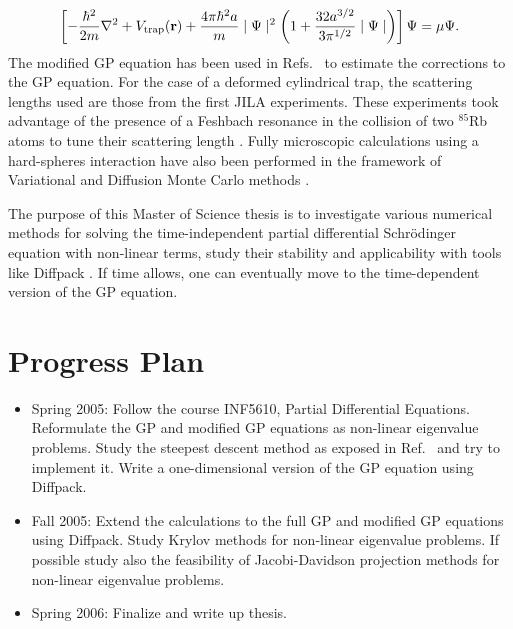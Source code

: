 \begin{equation}
  \left [ - \frac {\hbar^2}{2m} \nabla^2 + V_{\mathrm{trap}}({\bf r})+\frac {4 \pi \hbar^2 a}{m} \mid \Psi \mid^2 
    \left (1 + \frac {32 a^{3/2}}{3 \pi^{1/2}} \mid \Psi\mid \right)
    \right ] \Psi =  \mu \Psi .
\label{gp2}
\end{equation}
The modified GP equation has been used in Refs.~\cite{jon2005,fabro99} to estimate the 
corrections to the GP equation. For the case of a
deformed cylindrical trap, the  scattering lengths used 
are those from the first JILA experiments. These experiments took 
advantage of the  presence of a Feshbach resonance in the collision of two
$^{85}$Rb atoms to tune their scattering length \cite{dalfovo99}.
Fully microscopic calculations using  a hard-spheres interaction have
also been performed in the framework of Variational and Diffusion Monte
Carlo methods \cite{jon2005,glyde1,glyde2,glyde3,blume1}. 

The purpose of this Master of Science thesis
is to investigate various numerical methods for solving
the time-independent partial differential Schr\"odinger equation with non-linear terms, 
study their stability and applicability with tools like Diffpack \cite{hpl}.
If time allows, one can eventually move to the time-dependent version of the GP equation.



\section*{Progress Plan}
\begin{itemize}
\item Spring 2005: Follow the course INF5610, Partial Differential Equations. Reformulate
the GP and modified GP equations as non-linear eigenvalue problems. 
Study the steepest descent method as exposed in Ref.~\cite{flo80} 
and try to implement it.
Write a one-dimensional version of the GP equation using Diffpack. 
\item Fall 2005: Extend the calculations to the full GP and modified GP equations
using Diffpack. Study Krylov methods for non-linear eigenvalue problems.
If possible study also the feasibility of Jacobi-Davidson projection methods for
non-linear eigenvalue problems. 
\item Spring 2006: Finalize and write up thesis. 
\end{itemize}



